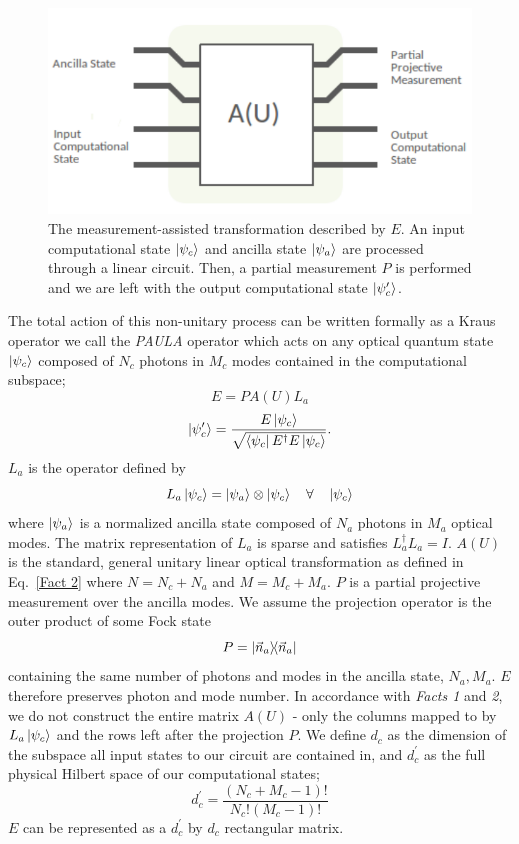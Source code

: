 \documentclass[aps,pra,twocolumn,showpacs,superscriptaddress,floatfix,10pt]{revtex4}
\begin{document}
 \begin{figure}[h]
 	\centering
 	\includegraphics[width=0.5 \textwidth]{./PAULA.pdf}
 	\caption{The measurement-assisted transformation described by $E$. An input computational state $\ket{\psi_c}$ and ancilla state $\ket{\psi_a}$ are processed through a linear circuit. Then, a partial measurement $P$ is performed and we are left with the output computational state $\ket{\psi_c^\prime}$.}
 	\label{Figure - PAULA Operator}
 \end{figure}
The total action of this non-unitary process can be written formally as a Kraus operator we call the \textit{PAULA} operator which acts on any optical quantum state $\ket{\psi_{c}}$ composed of $N_c$ photons in $M_c$ modes contained in the computational subspace;
\begin{equation}
\label{Kraus Paula Operator}
E = P A(U) L_a
\end{equation} 
\begin{equation}
\ket{\psi_{c}^\prime} = \frac{E \ket{\psi_{c}}}{\sqrt{ \bra{\psi_c} E^\dagger E \ket{\psi_c} }}.
\end{equation}
$L_a$ is the operator defined by
\begin{equation}
\label{Ancilla Linker}
L_a \ket{\psi_{c}} = \ket{\psi_a} \otimes \ket{\psi_{c}} \quad  \forall \quad \ket{\psi_{c}}
\end{equation}
where $\ket{\psi_a}$ is a normalized ancilla state composed of $N_a$ photons in $M_a$ optical modes. The matrix representation of $L_a$ is sparse and satisfies $L_a^\dagger L_a = I$.
$A(U)$ is the standard, general unitary linear optical transformation as defined in Eq.~\ref{Fact 2} where $N=N_c+N_a$ and $M=M_c+M_a$. $P$ is a partial projective measurement over the ancilla modes. We assume the projection operator is the outer product of some Fock state
\begin{equation}
P = \outerproduct{\vec{n}_a}{\vec{n}_a}
\end{equation}
containing the same number of photons and modes in the ancilla state, $N_a,M_a$. $E$ therefore preserves photon and mode number. In accordance with \textit{Facts 1} and \textit{2}, we do not construct the entire matrix $A(U)$ - only the columns mapped to by $L_a \ket{\psi_{c}}$ and the rows left after the projection $P$. We define $d_c$ as the dimension of the subspace all input states to our circuit are contained in, and $d_c^\prime$ as the full physical Hilbert space of our computational states;
\begin{equation}
	d_c^\prime = \frac{(N_c+M_c-1)!}{N_c! (M_c-1)!}
\end{equation}
$E$ can be represented as a $d_c^\prime$ by $d_c$ rectangular matrix.
\end{document}
